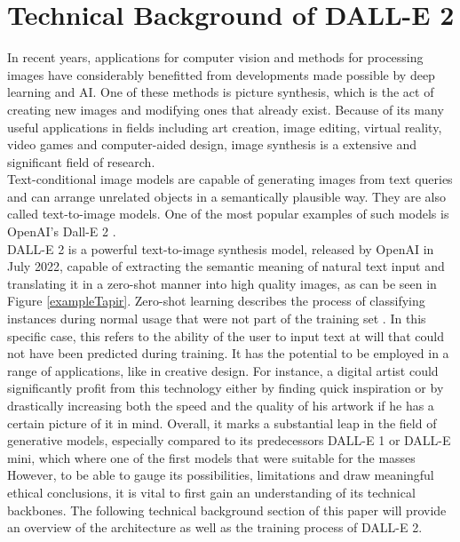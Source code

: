 \documentclass[10pt,twocolumn,twoside]{osajnl}
\begin{document}
\section{Technical Background of DALL-E 2}
In recent years, applications for computer vision and methods for processing images have considerably benefitted from developments made possible by deep learning and AI. 
One of these methods is picture synthesis, which is the act of creating new images and modifying ones that already exist. 
Because of its many useful applications in fields including art creation, image editing, virtual reality, video games and computer-aided design, image synthesis is a extensive and significant field of research.\\
Text-conditional image models are capable of generating images from text queries and can arrange unrelated objects in a semantically plausible way. They are also called text-to-image models.
One of the most popular examples of such models is OpenAI's Dall-E 2 \cite{DallE}.\\ 
DALL-E 2 is a powerful text-to-image synthesis model, released by OpenAI in July 2022, capable of extracting the semantic meaning of natural text input and translating it in a zero-shot manner \cite{zeroShot} into high quality images, as can be seen in Figure \ref{exampleTapir}.
Zero-shot learning describes the process of classifying instances during normal usage that were not part of the training set \cite{mfdp}.
In this specific case, this refers to the ability of the user to input text at will that could not have been predicted during training.
It has the potential to be employed in a range of applications, like in creative design. For instance, a digital artist could significantly profit from this technology either by 
finding quick inspiration or by drastically increasing both the speed and the quality of his artwork if he has a certain picture of it in mind.
Overall, it marks a substantial leap in the field of generative models, especially compared to its predecessors DALL-E 1 or DALL-E mini, which where one of the first models that were suitable for the masses \cite{}%
However, to be able to gauge its possibilities, limitations and draw meaningful ethical conclusions, it is vital to first gain an understanding of its technical backbones.
The following technical background section of this paper will provide an overview of the architecture as well as the training process of DALL-E 2. 
\end{document}
